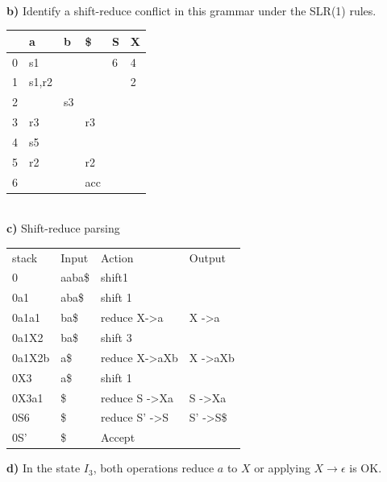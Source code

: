 \documentclass[a4paper]{exam}
\begin{document}
\begin{solution}
\begin{tikzpicture}[x=0.75pt,y=0.75pt,yscale=-1,xscale=1]
    \end{tikzpicture}
\\ 
\textbf{b)} 
    Identify a shift-reduce conﬂict in this grammar under the SLR(1) rules.
    \begin{table}[H]
        \begin{tabular}{l|lll|ll}
        \hline
          & a     & b  & \$  & S & X \\ \hline
        0 & s1    &    &     & 6 & 4 \\
        1 & s1,r2 &    &     &   & 2 \\
        2 &       & s3 &     &   &   \\
        3 & r3    &    & r3  &   &   \\
        4 & s5    &    &     &   &   \\
        5 & r2    &    & r2  &   &   \\
        6 &       &    & acc &   &  
        \end{tabular}
    \end{table}
    \\
\textbf{c)} Shift-reduce parsing
    \begin{table}[H]
        \begin{tabular}{llll}
        stack  & Input  & Action                     & Output               \\
        0      & aaba\$ & shift1                     &                      \\
        0a1    & aba\$  & shift 1                    &                      \\
        0a1a1  & ba\$   & reduce X-\textgreater{}a   & X -\textgreater a    \\
        0a1X2  & ba\$   & shift 3                    &                      \\
        0a1X2b & a\$    & reduce X-\textgreater{}aXb & X -\textgreater aXb  \\
        0X3    & a\$    & shift 1                    &                      \\
        0X3a1  & \$     & reduce S -\textgreater Xa  & S -\textgreater Xa   \\
        0S6    & \$     & reduce S' -\textgreater S  & S' -\textgreater S\$ \\
        0S'    & \$     & Accept                     &                     
        \end{tabular}
    \end{table}
\textbf{d)} In the state $I_{3}$, both operations reduce $a$ to $X$ or applying $X \rightarrow \epsilon$ is OK.
\end{solution}
\end{document}
